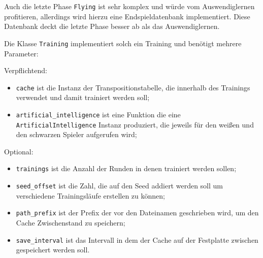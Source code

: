 \documentclass[11pt]{article}
\providecommand{\tightlist}{%
      \setlength{\itemsep}{0pt}\setlength{\parskip}{0pt}}
\begin{document}
Auch die letzte Phase \texttt{Flying} ist sehr komplex und würde vom
Auswendiglernen profitieren, allerdings wird hierzu eine
Endspieldatenbank implementiert. Diese Datenbank deckt die letzte Phase
besser ab als das Auswendiglernen.

    Die Klasse \texttt{Training} implementiert solch ein Training und
benötigt mehrere Parameter:

Verpflichtend: 
\begin{itemize}
    \tightlist
    \item \texttt{cache} ist die Instanz der
    Transpositionstabelle, die innerhalb des Trainings verwendet und damit
    trainiert werden soll;
    \item \texttt{artificial\_intelligence} ist eine
    Funktion die eine \texttt{ArtificialIntelligence} Instanz produziert,
    die jeweils für den weißen und den schwarzen Spieler aufgerufen wird;
\end{itemize}

Optional:
\begin{itemize}
    \tightlist
    \item \texttt{trainings} ist die Anzahl der Runden in denen
    trainiert werden sollen;
    \item \texttt{seed\_offset} ist die Zahl, die auf
    den Seed addiert werden soll um verschiedene Trainingsläufe erstellen zu
    können;
    \item \texttt{path\_prefix} ist der Prefix der vor den Dateinamen
    geschrieben wird, um den Cache Zwischenstand zu speichern;
    \item \texttt{save\_interval} ist das Intervall in dem der Cache auf der
    Festplatte zwischen gespeichert werden soll.
\end{itemize}
\end{document}
